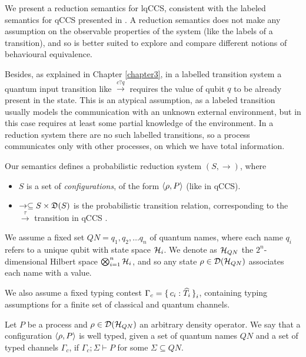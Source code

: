 We present a reduction semantics for lqCCS, consistent with the labeled semantics for qCCS presented in \cite{fengBisimulationQuantumProcesses2012, dengOpenBisimulationQuantum2012}. A reduction semantics does not make any assumption on the observable properties of the system (like the labels of a transition), and so is better suited to explore and compare different notions of behavioural equivalence.

Besides, as explained in Chapter \ref{chapter3}, in a labelled transition system a quantum input transition like $\xrightarrow{c?q}$ requires the value of qubit $q$ to be already present in the state. This is an atypical assumption, as a labeled transition usually models the communication with an unknown external environment, but in this case requires at least some partial knowledge of the environment. In a reduction system there are no such labelled transitions, so a process communicates only with other processes, on which we have total information.

Our semantics defines a probabilistic reduction system $(S, \rightarrow )$, where \begin{itemize}
\item $S$ is a set of \textit{configurations}, of the form $\langle\rho, P\rangle$ (like in qCCS).
\item $\rightarrow \subseteq S \times \mathfrak{D}(S)$ is the probabilistic transition relation, corresponding to the $\xrightarrow{\tau}$ transition in qCCS \cite{fengBisimulationQuantumProcesses2012, dengOpenBisimulationQuantum2012}.
\end{itemize}

We assume a fixed set  $QN = {q_1, q_2, \ldots q_n}$ of quantum names, where each name $q_i$ refers to a unique qubit with state space $\mathcal{H}_i$. We denote as $\mathcal{H}_{QN}$ the $2^n$-dimensional Hilbert space $\bigotimes_{i=1}^n \mathcal{H}_i$, and so any state 
$\rho \in \mathcal{D}(\mathcal{H}_{QN})$ associates each name with a value.

We also assume a fixed typing contest $\Gamma_c = \set{c_i: \widehat{T_i}}_i$, containing typing assumptions for a finite set of classical and quantum channels.

\begin{definition}
Let $P$ be a process and $\rho \in \mathcal{D}(\mathcal{H}_{QN})$ an arbitrary density operator. We say that a configuration $\langle\rho, P\rangle$ is well typed, given a set of quantum names $QN$ and a set of typed channels $\Gamma_c$, if $\Gamma_c; \Sigma \vdash P$ for some $\Sigma \subseteq QN$.

\end{definition}


